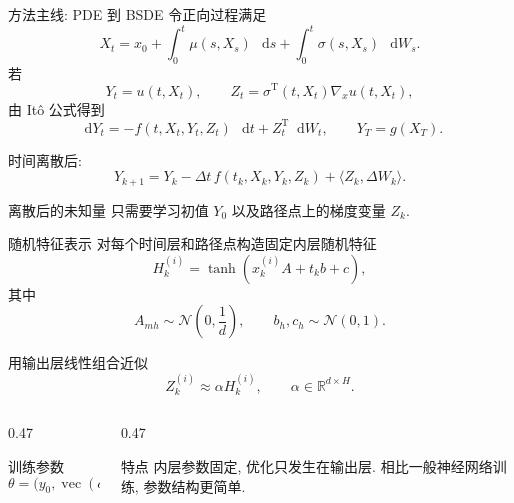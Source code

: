 \documentclass[aspectratio=169, 10pt, fontset=fandol]{ctexbeamer}
\newcommand\dif{\mathop{}\!\mathrm{d}}
\newcommand\T{\operatorname{T}}
\newcommand\R{\mathbb{R}}
\begin{document}
\begin{frame}{方法主线: PDE 到 BSDE}
  令正向过程满足
  \begin{equation*}
    X_t=x_0+\int_0^t \mu(s,X_s)\,\dif s
        +\int_0^t \sigma(s,X_s)\,\dif W_s.
  \end{equation*}
  若
  \begin{equation*}
    Y_t=u(t,X_t),\qquad
    Z_t=\sigma^{\T}(t,X_t)\nabla_x u(t,X_t),
  \end{equation*}
  由 It\^o 公式得到
  \begin{equation*}
    \dif Y_t=-f(t,X_t,Y_t,Z_t)\,\dif t+Z_t^{\T}\dif W_t,
    \qquad
    Y_T=g(X_T).
  \end{equation*}

  \vspace{0.25cm}
  时间离散后:
  \begin{equation*}
    Y_{k+1}=Y_k-\Delta t\,f(t_k,X_k,Y_k,Z_k)
    +\langle Z_k,\Delta W_k\rangle .
  \end{equation*}

  \begin{block}{离散后的未知量}
    只需要学习初值 $Y_0$ 以及路径点上的梯度变量 $Z_k$.
  \end{block}
\end{frame}

\begin{frame}{随机特征表示}
  对每个时间层和路径点构造固定内层随机特征
  \begin{equation*}
    H_k^{(i)}
    =
    \tanh\!\left(x_k^{(i)}A+t_kb+c\right),
  \end{equation*}
  其中
  \begin{equation*}
    A_{mh}\sim\mathcal{N}\!\left(0,\frac1d\right),
    \qquad
    b_h,c_h\sim\mathcal{N}(0,1).
  \end{equation*}

  \vspace{0.25cm}
  用输出层线性组合近似
  \begin{equation*}
    Z_k^{(i)}\approx \alpha H_k^{(i)},\qquad
    \alpha\in\R^{d\times H}.
  \end{equation*}

  \begin{columns}[T,onlytextwidth]
    \begin{column}{0.47\textwidth}
      \begin{block}{训练参数}
        \begin{equation*}
          \theta=\bigl(y_0,\operatorname{vec}(\alpha)\bigr).
        \end{equation*}
      \end{block}
    \end{column}
    \begin{column}{0.47\textwidth}
      \begin{block}{特点}
        内层参数固定, 优化只发生在输出层. 相比一般神经网络训练, 参数结构更简单.
      \end{block}
    \end{column}
  \end{columns}
\end{frame}
\end{document}
